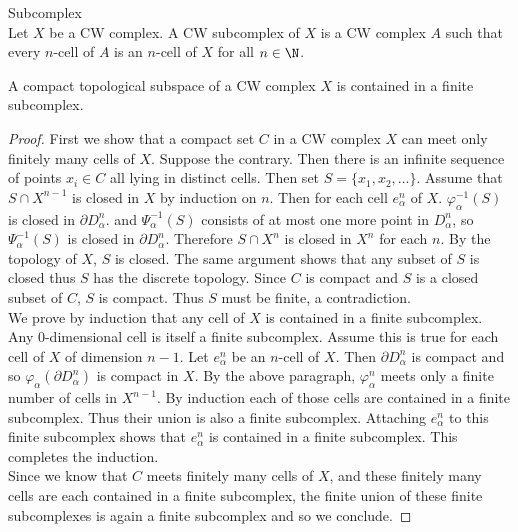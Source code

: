 \documentclass[a4paper]{article}
\begin{document}
\begin{defn}{Subcomplex}{}\\
Let $X$ be a CW complex. A CW subcomplex of $X$ is a CW complex $A$ such that every $n$-cell of $A$ is an $n$-cell of $X$ for all $n\in\N$. 
\end{defn}

\begin{prp}{}{} A compact topological subspace of a CW complex $X$ is contained in a finite subcomplex. 
\begin{proof}
First we show that a compact set $C$ in a CW complex $X$ can meet only finitely many cells of $X$. Suppose the contrary. Then there is an infinite sequence of points $x_i\in C$ all lying in distinct cells. Then set $S=\{x_1,x_2,\dots\}$. Assume that $S\cap X^{n-1}$ is closed in $X$ by induction on $n$. Then for each cell $e_\alpha^n$ of $X$. $\varphi_\alpha^{-1}(S)$ is closed in $\partial D_\alpha^n$. and $\Psi_\alpha^{-1}(S)$ consists of at most one more point in $D_\alpha^n$, so $\Psi_\alpha^{-1}(S)$ is closed in $\partial D_\alpha^n$. Therefore $S\cap X^n$ is closed in $X^n$ for each $n$. By the topology of $X$, $S$ is closed. The same argument shows that any subset of $S$ is closed thus $S$ has the discrete topology. Since $C$ is compact and $S$ is a closed subset of $C$, $S$ is compact. Thus $S$ must be finite, a contradiction. \\

We prove by induction that any cell of $X$ is contained in a finite subcomplex. Any $0$-dimensional cell is itself a finite subcomplex. Assume this is true for each cell of $X$ of dimension $n-1$. Let $e_\alpha^n$ be an $n$-cell of $X$. Then $\partial D_\alpha^n$ is compact and so $\varphi_\alpha(\partial D_\alpha^n)$ is compact in $X$. By the above paragraph, $\varphi_\alpha^n$ meets only a finite number of cells in $X^{n-1}$. By induction each of those cells are contained in a finite subcomplex. Thus their union is also a finite subcomplex. Attaching $e_\alpha^n$ to this finite subcomplex shows that $e_\alpha^n$ is contained in a finite subcomplex. This completes the induction. \\

Since we know that $C$ meets finitely many cells of $X$, and these finitely many cells are each contained in a finite subcomplex, the finite union of these finite subcomplexes is again a finite subcomplex and so we conclude. 
\end{proof}
\end{prp}
\end{document}
